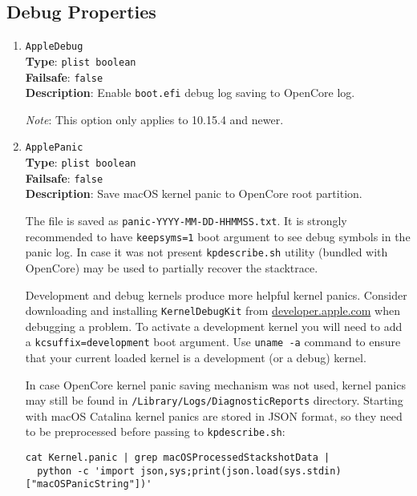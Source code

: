 \documentclass[]{article}
\begin{document}
\subsection{Debug Properties}\label{miscdebugprops}

\begin{enumerate}

\item
  \texttt{AppleDebug}\\
  \textbf{Type}: \texttt{plist\ boolean}\\
  \textbf{Failsafe}: \texttt{false}\\
  \textbf{Description}: Enable \texttt{boot.efi} debug log saving to OpenCore log.

  \emph{Note}: This option only applies to 10.15.4 and newer.

\item
  \texttt{ApplePanic}\\
  \textbf{Type}: \texttt{plist\ boolean}\\
  \textbf{Failsafe}: \texttt{false}\\
  \textbf{Description}: Save macOS kernel panic to OpenCore root partition.

  The file is saved as \texttt{panic-YYYY-MM-DD-HHMMSS.txt}. It is strongly
  recommended to have \texttt{keepsyms=1} boot argument to see debug symbols
  in the panic log. In case it was not present \texttt{kpdescribe.sh} utility
  (bundled with OpenCore) may be used to partially recover the stacktrace.

  Development and debug kernels produce more helpful kernel panics.
  Consider downloading and installing \texttt{KernelDebugKit} from
  \href{https://developer.apple.com}{developer.apple.com} when debugging a problem.
  To activate a development kernel you will need to add a \texttt{kcsuffix=development}
  boot argument. Use \texttt{uname -a} command to ensure that your current loaded
  kernel is a development (or a debug) kernel.

  In case OpenCore kernel panic saving mechanism was not used, kernel panics may
  still be found in \texttt{/Library/Logs/DiagnosticReports} directory.
  Starting with macOS Catalina kernel panics are stored in JSON format, so they
  need to be preprocessed before passing to \texttt{kpdescribe.sh}:

\begin{lstlisting}[label=kpanic, style=ocbash]
cat Kernel.panic | grep macOSProcessedStackshotData |
  python -c 'import json,sys;print(json.load(sys.stdin)["macOSPanicString"])'
\end{lstlisting}


\end{enumerate}
\end{document}
